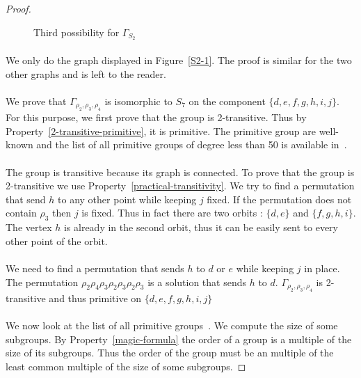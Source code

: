 \begin{proof}
\begin{figure}[H]
\begin{center}
\begin{tikzpicture}[scale=.8]
      \end{tikzpicture}
      \caption{Third possibility for $\Gamma_{S_2}$}
    \end{center}
  \end{figure}

  \paragraph{}
  We only do the graph displayed in Figure~\ref{S2-1}. The proof is similar for the two other graphs and is left to the reader.

  \paragraph{}
  We prove that $\Gamma_{\rho_2,\rho_3,\rho_4}$ is isomorphic to $S_7$ on the component $\{d,e,f,g,h,i,j\}$. For this purpose, we first prove that the group is 2-transitive. Thus by Property~\ref{2-transitive-primitive}, it is primitive. The primitive group are well-known and the list of all primitive groups of degree less than 50 is available in~\cite{buekenhout1996list}.

  \paragraph{}
  The group is transitive because its graph is connected. To prove that the group is 2-transitive we use Property~\ref{practical-transitivity}. We try to find a permutation that send $h$ to any other point while keeping $j$ fixed. If the permutation does not contain $\rho_3$ then $j$ is fixed. Thus in fact there are two orbits : $\{d,e\}$ and $\{f,g,h,i\}$. The vertex $h$ is already in the second orbit, thus it can be easily sent to every other point of the orbit.

  \paragraph{}
  We need to find a permutation that sends $h$ to $d$ or $e$ while keeping $j$ in place. The permutation $\rho_2 \rho_4 \rho_3 \rho_2 \rho_3 \rho_2 \rho_3$ is a solution that sends $h$ to $d$. $\Gamma_{\rho_2, \rho_3, \rho_4}$ is 2-transitive and thus primitive on $\{d,e,f,g,h,i,j\}$

  \paragraph{}
  We now look at the list of all primitive groups~\cite{buekenhout1996list}. We compute the size of some subgroups. By Property~\ref{magic-formula} the order of a group is a multiple of the size of its subgroups. Thus the order of the group must be an multiple of the least common multiple of the size of some subgroups.


\end{proof}

